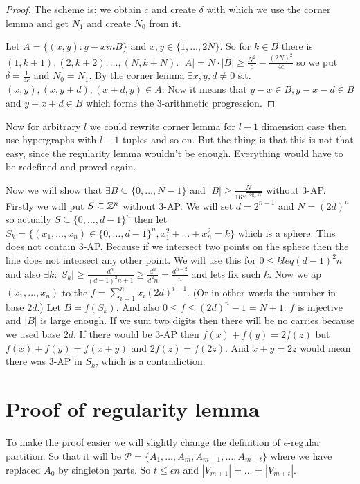 \begin{proof}
	The scheme is: we obtain $c$ and create $\delta$ with which we use the corner lemma and get $N_1$ and create $N_0$ from it.
	
	Let $A = \{(x,y) : y-x in B\}$ and $x,y \in \{1, \dots, 2N\}$. So for $k \in B$ there is $(1,k+1), (2,k+2), \dots, (N, k+N)$. $|A| = N \cdot |B| \geq \frac{N^2}{c} - \frac{(2N)^2}{4c}$ so we put $\delta = \frac{1}{4c}$ and $N_0 = N_1$. By the corner lemma $\exists x,y,d \neq 0$ s.t. $(x,y), (x,y+d), (x+d,y) \in A$. Now it means that $y-x \in B, y-x -d \in B$ and $y-x+d \in B$ which forms the 3-arithmetic progression.
\end{proof}

Now for arbitrary $l$ we could rewrite corner lemma for $l-1$ dimension case then use hypergraphs with $l-1$ tuples and so on. But the thing is that this is not that easy, since the regularity lemma wouldn't be enough. Everything would have to be redefined and proved again. %

Now we will show that $\exists B \subseteq \{0, \dots, N-1\}$ and $|B| \geq \frac{N}{16^{\sqrt{\log_e N}}}$ without 3-AP. Firstly we will put $S \subseteq \mathbb{Z}^n$ without 3-AP. We will set $d = 2^{n-1}$ and $N = (2d)^n$ so actually $S \subseteq \{0, \dots, d-1\}^n$ then let $S_k = \{(x_1, \dots, x_n) \in \{0, \dots, d-1\}^n, x_1^2 + \dots + x_n^2 = k\}$ which is a sphere. This does not contain 3-AP. Because if we intersect two points on the sphere then the line does not intersect any other point. We will use this for $0 \leq k leq (d-1)^2n$ and also $\exists k: |S_k| \geq \frac{d^n}{(d-1)^2n+1} \geq \frac{d^n}{d^2n} = \frac{d^{n-2}}{n}$ and lets fix such $k$. Now we ap $(x_1, \dots, x_n)$ to the $f = \sum_{i = 1}^n x_i (2d)^{i-1}$. (Or in other words the number in base $2d$.) Let $B = f(S_k)$. And also $0 \leq f \leq (2d)^n - 1 = N +1$. $f$ is injective and $|B|$ is large enough. If we sum two digits then there will be no carries because we used base $2d$. If there would be 3-AP then $f(x) + f(y) = 2f(z)$ but $f(x) + f(y) = f(x + y)$ and $2f(z) = f(2z)$. And $x + y = 2z$ would mean there was 3-AP in $S_k$, which is a contradiction.

\section{Proof of regularity lemma}

To make the proof easier we will slightly change the definition of $\epsilon$-regular partition. So that it will be $\mathcal{P} = \{A_1, \dots, A_m, A_{m+1}, \dots, A_{m+t}\}$ where we have replaced $A_0$ by singleton parts. So $t \leq \epsilon n$ and $|V_{m+1}| = \dots = |V_{m+t}|$.


